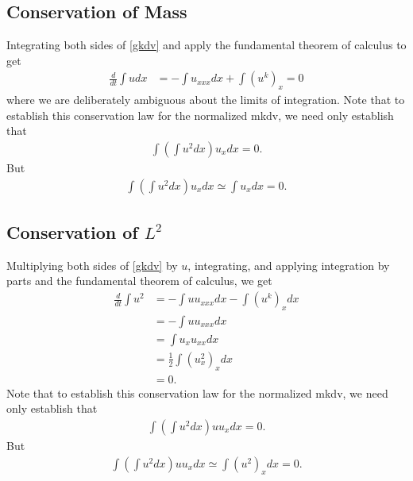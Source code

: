 \documentclass[12pt,reqno]{amsart}
\numberwithin{equation}{section}  %
\begin{document}
\subsection{Conservation of Mass} 
\label{ssec:c-mass}
Integrating both sides of \eqref{gkdv} and apply the fundamental theorem of
calculus to get
%
%
\begin{equation*}
\begin{split}
  \frac{d}{dt} \int u dx & = - \int u_{xxx} dx + \int (u^{k})_{x}  = 0
\end{split}
\end{equation*}
%
%
where we are deliberately ambiguous about the limits of integration. 
Note that to establish this conservation law for the normalized mkdv, we need
only establish that
%
%
\begin{equation*}
\begin{split}
  \int \left ( \int u^{2} dx \right ) u_{x} dx = 0.
\end{split}
\end{equation*}
%
%
But 
\begin{equation*}
\begin{split}
  \int \left ( \int u^{2} dx \right ) u_{x} dx \simeq \int  u_{x} dx =
  0.
\end{split}
\end{equation*}
%
%
\subsection{Conservation of $L^{2}$}
\label{ssec:c-l2}
Multiplying both sides of \eqref{gkdv} by $u$, integrating, and applying
integration by parts and the
fundamental theorem of calculus, we get
%
%
\begin{equation*}
\begin{split}
  \frac{d}{dt} \int u^{2} 
  & = - \int u u_{xxx} dx - \int (u^{k})_{x} dx
  \\
  & = - \int u u_{xxx} dx
  \\
  & =  \int u_{x} u_{xx}dx
  \\
  & = \frac{1}{2} \int (u_{x}^{2})_{x} dx
  \\
  & = 0.
\end{split}
\end{equation*}
%
%
Note that to establish this conservation law for the normalized mkdv, we need
only establish that
%
%
\begin{equation*}
\begin{split}
  \int \left ( \int u^{2} dx \right ) u u_{x} dx = 0.
\end{split}
\end{equation*}
%
%
But 
\begin{equation*}
\begin{split}
  \int \left ( \int u^{2} dx \right ) u u_{x} dx \simeq \int  (u^{2})_{x} dx =
  0.
\end{split}
\end{equation*}
%
%
%
%
\end{document}
